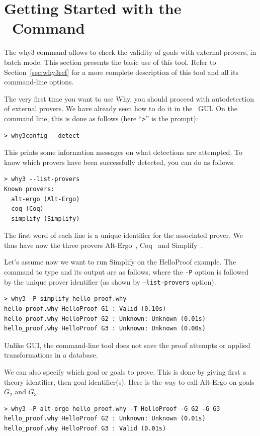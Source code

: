 \section{Getting Started with the \why\ Command}
\label{sec:batch}

The why3 command allows to check the validity of goals with external
provers, in batch mode. This section presents the basic use of this
tool. Refer to Section~\ref{sec:why3ref} for a more complete
description of this tool and all its command-line options.

The very first time you want to use Why, you should proceed with
autodetection of external provers. We have already seen how to do
it in the \why\ GUI. On the command line, this is done as follows
(here ``\texttt{>}'' is the prompt):
\begin{verbatim}
> why3config --detect
\end{verbatim}
This prints some information messages on what detections are attempted. To know which
provers have been successfully detected, you can do as follows.
\begin{verbatim}
> why3 --list-provers
Known provers:
  alt-ergo (Alt-Ergo)
  coq (Coq)
  simplify (Simplify)
\end{verbatim}
The first word of each line is a unique identifier for the associated prover. We thus
have now the three provers Alt-Ergo~\cite{ergo}, Coq~\cite{CoqArt} and
Simplify~\cite{simplify05}.

Let's assume now we want to run Simplify on the HelloProof
example. The command to type and its output are as follows, where the
\verb|-P| option is followed by the unique prover identifier (as shown
by \texttt{--list-provers} option).
\begin{verbatim}
> why3 -P simplify hello_proof.why
hello_proof.why HelloProof G1 : Valid (0.10s)
hello_proof.why HelloProof G2 : Unknown: Unknown (0.01s)
hello_proof.why HelloProof G3 : Unknown: Unknown (0.00s)
\end{verbatim}
Unlike \why GUI, the command-line tool does not save the proof attempts
or applied transformations in a database.

We can also specify which goal or goals to prove. This is done by giving
first a theory identifier, then goal identifier(s). Here is the way to
call Alt-Ergo on goals $G_2$ and $G_3$.
\begin{verbatim}
> why3 -P alt-ergo hello_proof.why -T HelloProof -G G2 -G G3
hello_proof.why HelloProof G2 : Unknown: Unknown (0.01s)
hello_proof.why HelloProof G3 : Valid (0.01s)
\end{verbatim}

